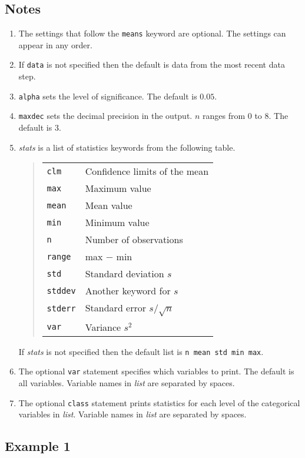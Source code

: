 \documentclass[12pt]{article}
\begin{document}
\subsection*{Notes}

\begin{enumerate}
\item
The settings that follow the {\tt means} keyword are optional.
The settings can appear in any order.
\item
If {\tt data} is not specified then the default is data from
the most recent data step.
\item
{\tt alpha} sets the level of significance.
The default is $0.05$.
\item
{\tt maxdec} sets the decimal precision in the output.
$n$ ranges from 0 to 8.
The default is 3.
\item
{\it stats} is a list of statistics keywords
from the following table.
\begin{quote}
\begin{tabular}{ll}
{\tt clm} & Confidence limits of the mean\\
{\tt max} & Maximum value\\
{\tt mean} & Mean value\\
{\tt min} & Minimum value\\
{\tt n} & Number of observations\\
{\tt range} & max $-$ min\\
{\tt std} & Standard deviation $s$\\
{\tt stddev} & Another keyword for $s$\\
{\tt stderr} & Standard error $s/\sqrt n$\\
{\tt var} & Variance $s^2$
\end{tabular}
\end{quote}
If {\it stats} is not specified then the default list is
{\tt n mean std min max}.
\item
The optional {\tt var} statement specifies which variables to print.
The default is all variables.
Variable names in {\it list} are separated by spaces.
\item
The optional {\tt class} statement prints statistics for each level
of the categorical variables in {\it list}.
Variable names in {\it list} are separated by spaces.
\end{enumerate}

\subsection*{Example 1}
\end{document}
